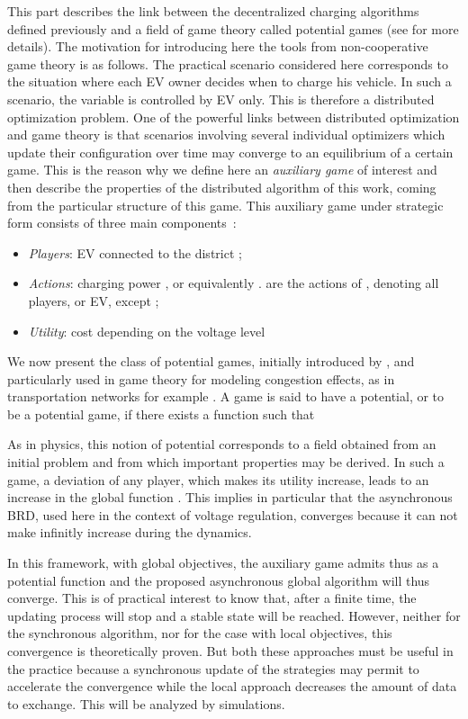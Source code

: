 \documentclass[journal]{IEEEtran}
\begin{document}
This part describes the link between the decentralized charging algorithms defined previously and a field of game theory called potential games (see \cite{beaude12} for more details). The motivation for introducing here the tools from non-cooperative game theory is as follows. The practical scenario considered here corresponds to the situation where each EV owner decides when to charge his vehicle. In such a scenario, the variable  is controlled by EV  only. This is therefore a distributed optimization problem. One of the powerful links between distributed optimization and game theory is that scenarios involving several individual optimizers which update their configuration over time may converge to an equilibrium of a certain game. This is the reason why we define here an \textit{auxiliary game} of interest and then describe the properties of the distributed algorithm of this work, coming from the particular structure of this game. This auxiliary game under strategic form consists of three main components~:

\begin{itemize}
\item \textit{Players}: EV  connected to the district ;
\item \textit{Actions}: charging power , or equivalently .  are the actions of , denoting all players, or EV, except  ;
\item \textit{Utility}: cost depending on the voltage level

\end{itemize}

We now present the class of potential games, initially introduced by \cite{Monderer1996}, and particularly used in game theory for modeling congestion effects, as in transportation networks for example \cite{Wardrop1952}. A game is said to have a potential, or to be a potential game, if there exists a function  such that 


As in physics, this notion of potential corresponds to a field obtained from an initial problem and from which important properties may be derived. In such a game, a deviation of any player, which makes its utility increase, leads to an increase in the global function . This implies in particular that the asynchronous BRD, used here in the context of voltage regulation, converges because it can not make  infinitly increase during the dynamics.

In this framework, with global objectives, the auxiliary game admits thus  as a potential function and the proposed asynchronous global algorithm will thus converge. This is of practical interest to know that, after a finite time, the updating process will stop and a stable state will be reached. However, neither for the synchronous algorithm, nor for the case with local objectives, this convergence is theoretically proven. But both these approaches must be useful in the practice because a synchronous update of the strategies may permit to accelerate the convergence while the local approach decreases the amount of data to exchange. This will be analyzed by simulations.
\end{document}
